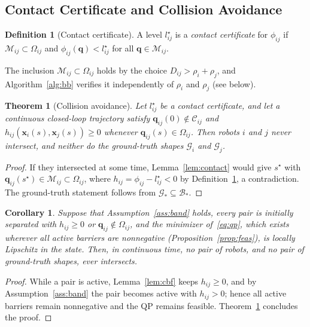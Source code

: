 \documentclass[journal]{IEEEtran}
\newtheorem{theorem}{Theorem}
\newtheorem{corollary}{Corollary}
\theoremstyle{definition}
\newtheorem{definition}{Definition}
\newcommand{\CO}{\mathcal{C}}
\newcommand{\Mset}{\mathcal{M}}
\begin{document}
\subsection{Contact Certificate and Collision Avoidance}
\begin{definition}[Contact certificate]\label{def:cert}
A level $l^\star_{ij}$ is a \emph{contact certificate} for $\phi_{ij}$ if
$\Mset_{ij}\subset\Omega_{ij}$ and $\phi_{ij}(\mathbf q)<l^\star_{ij}$ for all
$\mathbf q\in\Mset_{ij}$.
\end{definition}
The inclusion $\Mset_{ij}\subset\Omega_{ij}$ holds by the choice $D_{ij}>\rho_i+\rho_j$, and
Algorithm~\ref{alg:bb} verifies it independently of $\rho_i$ and $\rho_j$ (see below).

\begin{theorem}[Collision avoidance]\label{thm:safe}
Let $l^\star_{ij}$ be a contact certificate, and let a continuous closed-loop trajectory satisfy
$\mathbf q_{ij}(0)\notin\CO_{ij}$ and $h_{ij}(\mathbf x_i(s),\mathbf x_j(s))\ge0$ whenever
$\mathbf q_{ij}(s)\in\Omega_{ij}$. Then robots $i$ and $j$ never intersect, and neither do the
ground-truth shapes $\mathcal G_i$ and $\mathcal G_j$.
\end{theorem}
\begin{proof}
If they intersected at some time, Lemma~\ref{lem:contact} would give $s^\star$ with
$\mathbf q_{ij}(s^\star)\in\Mset_{ij}\subset\Omega_{ij}$, where $h_{ij}=\phi_{ij}-l^\star_{ij}<0$ by
Definition~\ref{def:cert}, a contradiction. The ground-truth statement follows from
$\mathcal G_\ast\subseteq\mathcal B_\ast$.
\end{proof}

\begin{corollary}\label{cor:closed}
Suppose that Assumption~\ref{ass:band} holds, every pair is initially separated with $h_{ij}\ge0$ or
$\mathbf q_{ij}\notin\Omega_{ij}$, and the minimizer of~\eqref{eq:qp}, which exists wherever all
active barriers are nonnegative (Proposition~\ref{prop:feas}), is locally Lipschitz in the state.
Then, in continuous time, no pair of robots, and no pair of ground-truth shapes, ever intersects.
\end{corollary}
\begin{proof}
While a pair is active, Lemma~\ref{lem:cbf} keeps $h_{ij}\ge0$, and by Assumption~\ref{ass:band}
the pair becomes active with $h_{ij}>0$; hence all active barriers remain nonnegative and the QP
remains feasible. Theorem~\ref{thm:safe} concludes the proof.
\end{proof}
\end{document}

